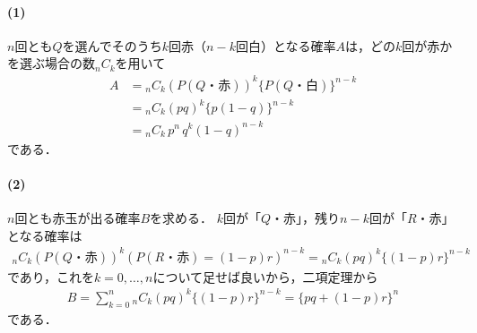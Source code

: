 \documentclass[../../main.tex]{subfiles}
\begin{document}
\paragraph{(1)}

$n$回とも$Q$を選んでそのうち$k$回赤（$n-k$回白）となる確率$A$は，どの$k$回が赤かを選ぶ場合の数${}_nC_{k}$を用いて
\begin{align}
  A
  &={}_nC_k(P(Q\text{・赤}))^k\{P(Q\text{・白})\}^{n-k} \\
  &={}_nC_k(pq)^k\{p(1-q)\}^{n-k} \\
  &={}_nC_k\,p^n\,q^k(1-q)^{n-k}
\end{align}
である．

\paragraph{(2)}

$n$回とも赤玉が出る確率$B$を求める．
$k$回が「$Q$・赤」，残り$n-k$回が「$R$・赤」となる確率は
\begin{align}
  {}_nC_k\left(P(Q\text{・赤})\right)^{k}\left(P(R\text{・赤})=(1-p)r\right)^{n-k} = {}_nC_k(pq)^k\{(1-p)r\}^{n-k}
\end{align}
であり，これを$k=0,\dots,n$について足せば良いから，二項定理から
\begin{align}
  B=\sum_{k=0}^n{}_nC_k(pq)^k\{(1-p)r\}^{n-k}=\{pq+(1-p)r\}^n
\end{align}
である．
\end{document}
